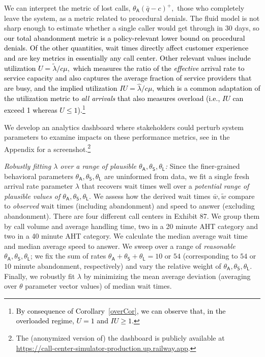 \documentclass[manuscript,screen,authorversion]{acmart}
\newcommand{\rev}[1]{\textcolor{black}{#1}}
\begin{document}
We can interpret the metric of lost calls, $\theta_{\mathsf{A}} (\bar{q}-c)^+,$ those who completely leave the system, as a metric related to procedural denials. The fluid model is not sharp enough to estimate whether a single caller would get through in $30$ days, so \rev{our total abandonment metric is a policy-relevant lower bound on procedural denials. Of the other quantities, wait times directly affect customer experience and are key metrics in essentially any call center.}
\rev{Other relevant values include utilization $U = {\tilde{\lambda}}/{c \mu} ,$ which measures the ratio of the \emph{effective} arrival rate to service capacity and also captures the average fraction of service providers that are busy, and the 
implied utilization
    $IU  ={\hat\lambda}/{c\mu}$, which is a common adaptation of the utilization metric to \emph{all arrivals} that also measures overload (i.e., $IU$ can exceed 1 whereas $U \leq 1$).\footnote{\rev{By consequence of Corollary~\ref{overCor}, we can observe that, in the overloaded regime, $U=1$ and $IU \geq 1$.}}}

We develop an analytics dashboard where stakeholders could perturb system parameters to examine impacts on these performance metrics, see  in the Appendix for a screenshot.\footnote{The (anonymized version of) the dashboard is publicly available at \url{https://call-center-simulator-production.up.railway.app}.}

\textit{Robustly fitting $\lambda$ over a range of plausible $\theta_{\mathsf{A}}, \theta_{\mathsf{S}}, \theta_{\mathsf{L}}$: } 
Since the finer-grained behavioral parameters $\theta_{\mathsf{A}}, \theta_{\mathsf{S}}, \theta_{\mathsf{L}}$ are uninformed from data, we fit a single fresh arrival rate parameter $\lambda$ that recovers wait times well over a \textit{potential range of plausible values of $\theta_{\mathsf{A}}, \theta_{\mathsf{S}}, \theta_{\mathsf{L}}$}. We assess how the derived wait times $\bar{w},\tilde{w}$ compare to \textit{observed} wait times (including abandonment) and speed to answer (excluding abandonment). 
There are four different call centers in Exhibit 87. We group them by call volume and average handling time, two in a 20 minute AHT category and two in a 40 minute AHT category. We calculate the median average wait time and median average speed to answer. 
We sweep over a range of \textit{reasonable} $\theta_{\mathsf{A}},\theta_{\mathsf{S}},\theta_{\mathsf{L}}$; we fix the sum of rates $\theta_{\mathsf{A}}+\theta_{\mathsf{S}}+\theta_{\mathsf{L}}=10$ or $54$ (corresponding to $54$ or $10$ minute abandonment, respectively) and vary the relative weight of $\theta_{\mathsf{A}},\theta_{\mathsf{S}},\theta_{\mathsf{L}}$. Finally, we robustly fit $\lambda$ by minimizing the mean average deviation (averaging over $\theta$ parameter vector values) of median wait times.
\end{document}
